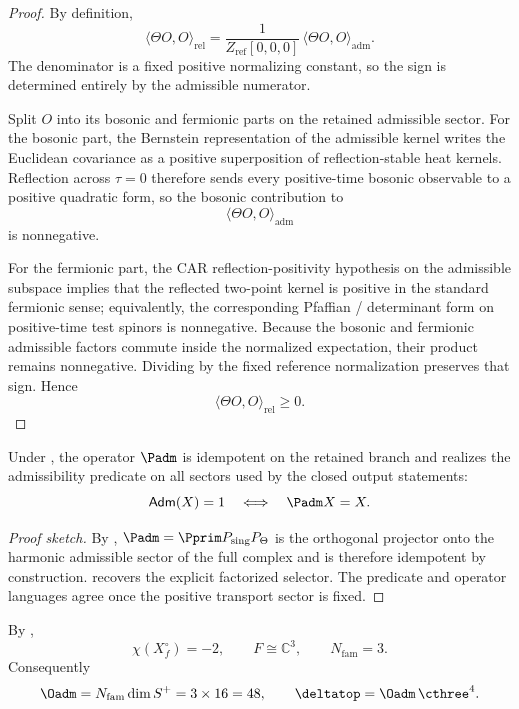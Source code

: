 
\begin{proof}
By definition,
\[
\langle \Theta O,O\rangle_{\mathrm{rel}}
=
\frac{1}{Z_{\mathrm{ref}}[0,0,0]}\,
\langle \Theta O,O\rangle_{\mathrm{adm}}.
\]
The denominator is a fixed positive normalizing constant, so the sign is determined entirely by the
admissible numerator.

Split $O$ into its bosonic and fermionic parts on the retained admissible sector. For the bosonic
part, the Bernstein representation of the admissible kernel writes the Euclidean covariance as a
positive superposition of reflection-stable heat kernels. Reflection across $\tau=0$ therefore sends
every positive-time bosonic observable to a positive quadratic form, so the bosonic contribution to
\[
\langle \Theta O,O\rangle_{\mathrm{adm}}
\]
is nonnegative.

For the fermionic part, the CAR reflection-positivity hypothesis on the admissible subspace implies
that the reflected two-point kernel is positive in the standard fermionic sense; equivalently, the
corresponding Pfaffian / determinant form on positive-time test spinors is nonnegative. Because the
bosonic and fermionic admissible factors commute inside the normalized expectation, their product
remains nonnegative. Dividing by the fixed reference normalization preserves that sign. Hence
\[
\langle \Theta O,O\rangle_{\mathrm{rel}}\ge 0.
\]
\end{proof}

\begin{theorem}
Under , the
operator $\Padm$ is idempotent on the retained branch and realizes the admissibility predicate
on all sectors used by the closed output statements:
\[
\mathsf{Adm}(X)=1
\quad\Longleftrightarrow\quad
\Padm X = X.
\]
\end{theorem}

\begin{proof}[Proof sketch]
By , $\Padm=\Pprim P_{\mathrm{sing}}P_\Theta$ is the orthogonal projector
onto the harmonic admissible sector of the full complex and is therefore idempotent by
construction.  recovers the explicit factorized
selector. The predicate and operator languages agree once the positive transport sector is fixed.
\end{proof}

\begin{theorem}
By ,
\[
\chi(X_f^\circ)=-2,
\qquad
F\cong\mathbb C^3,
\qquad
N_{\mathrm{fam}}=3.
\]
Consequently
\[
\Oadm=N_{\mathrm{fam}}\dim S^+=3\times 16=48,
\qquad
\deltatop=\Oadm\,\cthree^4.
\]
\end{theorem}

